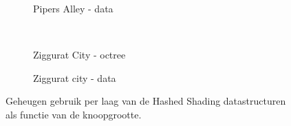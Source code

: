 \begin{figure}[t]
\begin{adjustbox}{minipage=\textwidth, scale=0.55}
\begin{subfigure}[b]{0.8\textwidth}
      \caption{Pipers Alley - data}
      \label{fig:hs-layered-mem:alley-data}
    \end{subfigure}
  \end{adjustbox} \\
  \begin{adjustbox}{minipage=\textwidth, scale=0.55}
    \begin{subfigure}[b]{0.8\textwidth}
      \centering
      \def\svgwidth{\textwidth}
      
      \caption{Ziggurat City - octree}
      \label{fig:hs-layered-mem:city-octree}
    \end{subfigure}
  \end{adjustbox} %
  \begin{adjustbox}{minipage=\textwidth, scale=0.55}
    \begin{subfigure}[b]{0.8\textwidth}
      \centering
      \def\svgwidth{\textwidth}
      
      \caption{Ziggurat city - data}
      \label{fig:hs-layered-mem:city-data}
    \end{subfigure}
  \end{adjustbox}
  \caption{\small Geheugen gebruik per laag van de Hashed Shading datastructuren als functie van de knoopgrootte.}
  \label{fig:hs-layered-mem}
\end{figure}

